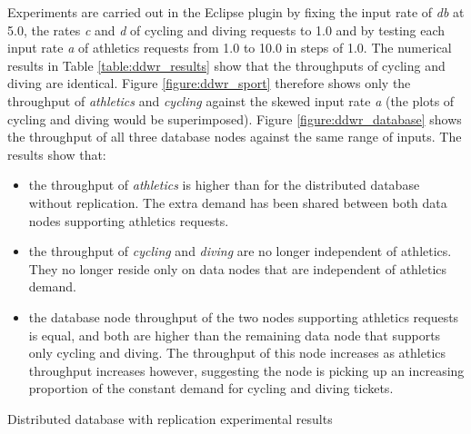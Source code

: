 \documentclass[runningheads]{llncs}
\begin{document}
Experiments are carried out in the Eclipse plugin by fixing the input rate of {\itshape db} at 5.0, the rates {\itshape c} and {\itshape d} of cycling and diving requests to 1.0 and by testing each input rate {\itshape a} of athletics requests from 1.0 to 10.0 in steps of 1.0.  The numerical results in Table \ref{table:ddwr_results} show that the throughputs of cycling and diving are identical.   Figure \ref{figure:ddwr_sport} therefore shows only the throughput of {\itshape athletics} and {\itshape cycling} against the skewed input rate {\itshape a} (the plots of cycling and diving would be superimposed).  Figure \ref{figure:ddwr_database} shows the throughput of all three database nodes against the same range of inputs.
The results show that:
\begin{itemize}
	\item the throughput of {\itshape athletics} is higher than for the distributed database without replication.  The extra demand has been shared between both data nodes supporting athletics requests.
	\item the throughput of {\itshape cycling} and {\itshape diving} are no longer independent of athletics.  They no longer reside only on data nodes that are independent of athletics demand.
	\item the database node throughput of the two nodes supporting athletics requests is equal, and both are higher than the remaining data node that supports only cycling and diving.  The throughput of this node increases as athletics throughput increases however, suggesting the node is picking up an increasing proportion of the constant demand for cycling and diving tickets.
\end{itemize}

\FloatBarrier
\begin{table}[h!]
	\centering
	\caption{Distributed database with replication experimental results}
	\label{table:ddwr_results}
\end{table}
\end{document}

